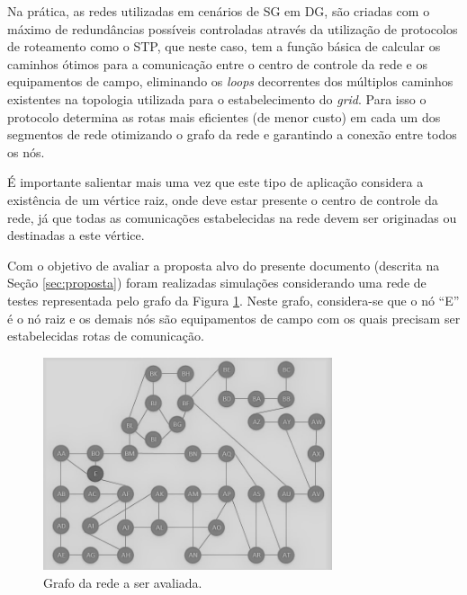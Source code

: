 \documentclass[12pt]{article}
\begin{document}
Na prática, as redes utilizadas em cenários de SG em DG, são criadas com o máximo de redundâncias possíveis controladas através da utilização de protocolos de roteamento como o STP, que neste caso, tem a função básica de calcular os caminhos ótimos para a comunicação entre o centro de controle da rede e os equipamentos de campo, eliminando os \emph{loops} decorrentes dos múltiplos caminhos existentes na topologia utilizada para o estabelecimento do \emph{grid}. Para isso o protocolo determina as rotas mais eficientes (de menor custo) em cada um dos segmentos de rede otimizando o grafo da rede e garantindo a conexão entre todos os nós.

É importante salientar mais uma vez que este tipo de aplicação considera a existência de um vértice raiz, onde deve estar presente o centro de controle da rede, já que todas as comunicações estabelecidas na rede devem ser originadas ou destinadas a este vértice.

Com o objetivo de avaliar a proposta alvo do presente documento (descrita na Seção \ref{sec:proposta}) foram realizadas simulações considerando uma rede de testes representada pelo grafo da Figura \ref{fig_rede_estudo}. Neste grafo, considera-se que o nó ``E'' é o nó raiz e os demais nós são equipamentos de campo com os quais precisam ser estabelecidas rotas de comunicação.

\begin{figure} %
	\centering
	\includegraphics[width=8.5cm]{Rede_Estudo_PB}
	\caption{Grafo da rede a ser avaliada.}
	\label{fig_rede_estudo}
\end{figure}
\end{document}
